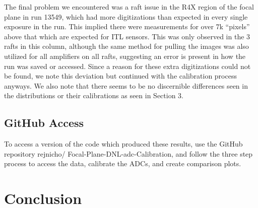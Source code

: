 \documentclass[11pt, letterpaper]{article}
\begin{document}
The final problem we encountered was a raft issue in the R4X region of the focal plane in run 13549, which had more digitizations than expected in every single exposure in the run. 
This implied there were measurements for over 7k “pixels” above that which are expected for ITL sensors. 
This was only observed in the 3 rafts in this column, although the same method for pulling the images was also utilized for all amplifiers on all rafts, suggesting an error is present in how the run was saved or accessed. 
Since a reason for these extra digitizations could not be found, we note this deviation but continued with the calibration process anyways. 
We also note that there seems to be no discernible differences seen in the distributions or their calibrations as seen in Section 3. 

\subsection{GitHub Access}
\indent 


To access a version of the code which produced these results, use the GitHub repository rejnicho/
Focal-Plane-DNL-adc-Calibration, and follow the three step process to access the data, calibrate the ADCs, and create comparison plots. 

\section{Conclusion}
\indent
\end{document}
